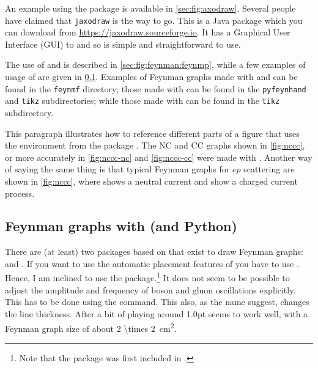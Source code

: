 An example using the package  is available in \cref{sec:fig:axodraw}.
Several people have claimed
that \texttt{jaxodraw} is the way to go. This is a Java package which
you can download from \url{https://jaxodraw.sourceforge.io}. It has
a Graphical User Interface (GUI) to  and so is simple and
straightforward to use.

The use of  and  is
described in \cref{sec:fig:feynman:feynmp}, while a few
examples of usage of \Package{\TikZ} are given in
\cref{sec:fig:feynman:tikz}.
Examples of Feynman graphs made
with  and  can be found in the \texttt{feynmf} directory;
those made with  can be found in the \texttt{pyfeynhand} and \texttt{tikz} subdirectories;
while those made with \Package{\TikZ} can be found in the \texttt{tikz} subdirectory.

\begin{tcblisting}{}
This paragraph illustrates how to reference different parts of a
figure that uses the environment  from
the package .
The NC and CC graphs shown in \cref{fig:nccc}, or more accurately
in \cref{fig:nccc-nc} and \cref{fig:nccc-cc} were made with .
Another way of saying the same thing is that typical Feynman graphs
for \(ep\) scattering are shown in \cref{fig:nccc},
where  shows a neutral current and 
show a charged current process.
\end{tcblisting}


\subsection{Feynman graphs with \TikZ (and Python)}%
\label{sec:fig:feynman:tikz}

There are (at least) two packages based on \TikZ that exist to draw Feynman graphs:
 and .
If you want to use the automatic placement features of 
you have to use \LuaLaTeX.
Hence, I am inclined to use the  package.\footnote{%
Note that the  package was first included in .}
It does not seem to be possible to adjust the amplitude and frequency
of boson and gluon oscillations explicitly.
This has to be done using the  command.
This also, as the name suggest, changes the line thickness.
After a bit of playing around \num{1.0}{pt} seems to work well,
with a Feynman graph size of about \qty[parse-numbers=false]{2 \times 2}{\cm^{2}}.

